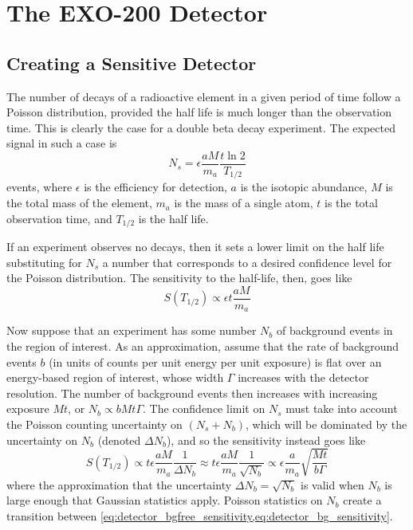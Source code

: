 \documentclass[herrin-thesis.tex]{subfiles}
\begin{document}
\chapter{The EXO-200 Detector}
\label{ch:detector}

\section{Creating a Sensitive Detector}
\label{sec:detector_sensitivity}
The number of decays of a radioactive element in a given period of time follow a Poisson distribution, provided the half life is much longer than the observation time. This is clearly the case for a double beta decay experiment. The expected signal in such a case is
\begin{equation}
N_{s} = \epsilon \frac{a M}{m_{a}} \frac{t \ln2}{T_{1/2}}
\label{eq:detector_N_expected}
\end{equation}
events, where  \(\epsilon\) is the efficiency for detection, \(a\) is the isotopic abundance, \(M\) is the total mass of the element, \(m_{a}\) is the mass of a single atom, \(t\) is the total observation time, and \(T_{1/2}\) is the half life.

If an experiment observes no decays, then it sets a lower limit on the half life substituting for \(N_s\) a number that corresponds to a desired confidence level for the Poisson distribution. The sensitivity to the half-life, then, goes like
\begin{equation}
S(T_{1/2}) \propto \epsilon t \frac{a M}{m_{a}}
\label{eq:detector_bgfree_sensitivity}
\end{equation}

Now suppose that an experiment has some number \(N_b\) of background events in the region of interest. As an approximation, assume that the rate of background events \(b\) (in units of counts per unit energy per unit exposure) is flat over an energy-based region of interest, whose width \(\Gamma\) increases with the detector resolution. The number of background events then increases with increasing exposure \(M t\), or  \(N_b \propto b M t \Gamma\). The confidence limit on \(N_s\) must take into account the Poisson counting uncertainty on \((N_s + N_b)\), which will be dominated by the uncertainty on \(N_b\) (denoted \(\Delta N_b\)), and so the sensitivity instead goes like
\begin{equation}
S(T_{1/2}) \propto t \epsilon \frac{a M}{m_{a}} \frac{1}{\Delta N_b} \approx t \epsilon \frac{a M}{m_{a}} \frac{1}{\sqrt{N_b}} \propto \epsilon \frac{a}{m_{a}} \sqrt{\frac{M t}{b \Gamma}}
\label{eq:detector_bg_sensitivity}
\end{equation}
where the approximation that the uncertainty \(\Delta N_b = \sqrt{N_b}\) is valid when \(N_b\) is large enough that Gaussian statistics apply. Poisson statistics on \(N_b\) create a transition between \cref{eq:detector_bgfree_sensitivity,eq:detector_bg_sensitivity}.
\end{document}
